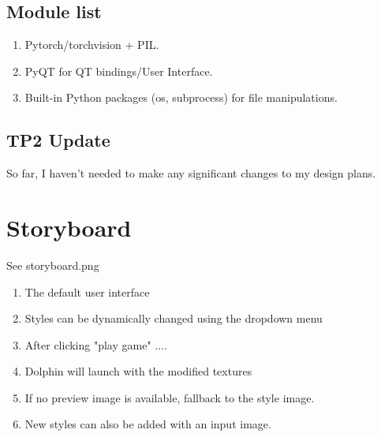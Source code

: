 \documentclass[12pt]{article}
\begin{document}
\subsection{Module list}
\begin{enumerate}
	\item Pytorch/torchvision + PIL.
	\item PyQT for QT bindings/User Interface.
	\item Built-in Python packages (os, subprocess) for file manipulations.
\end{enumerate}
\subsection{TP2 Update}
	So far, I haven't needed to make any significant changes to my design plans.
\section{Storyboard}
See storyboard.png
\begin{enumerate}[(1)]
    \item The default user interface
    \item Styles can be dynamically changed using the dropdown menu
    \item After clicking "play game" ....
    \item Dolphin will launch with the modified textures
    \item If no preview image is available, fallback to the style image.
    \item New styles can also be added with an input image.
\end{enumerate}
\end{document}
